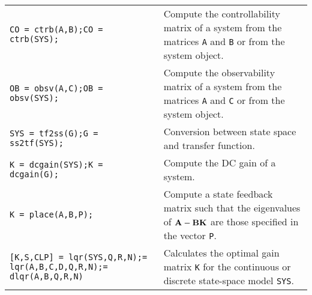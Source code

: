 \begin{landscape}
\begin{multicols*}{2}
\begin{table}[H]
\begin{tabularx}{\linewidth}{p{5cm} X}
				\texttt{CO = ctrb(A,B);\newline CO = ctrb(SYS);} & Compute the controllability matrix of a system from the matrices \texttt{A} and \texttt{B} or from the system object. \\

				\texttt{OB = obsv(A,C);\newline OB = obsv(SYS);} & Compute the observability matrix of a system from the matrices \texttt{A} and \texttt{C} or from the system object. \\

				\midrule
			
				\texttt{SYS = tf2ss(G);\newline G = ss2tf(SYS);} & Conversion between state space and transfer function. \\

				\texttt{K = dcgain(SYS);\newline K = dcgain(G);} & Compute the DC gain of a system. \\

				\midrule

				\texttt{K = place(A,B,P);} & Compute a state feedback matrix such that the eigenvalues of \(\bm{\mathrm{A}} - \bm{\mathrm{B}}\bm{\mathrm{K}}\) are those specified in the vector \texttt{P}. \\

				\texttt{[K,S,CLP] = lqr(SYS,Q,R,N);\newline [K,S,CLP] = lqr(A,B,C,D,Q,R,N);\newline [K,S,CLP] = dlqr(A,B,Q,R,N)} & Calculates the optimal gain matrix \texttt{K} for the continuous or discrete state-space model \texttt{SYS}. \\

				\bottomrule
			\end{tabularx}
		\end{table}

	\end{multicols*}
\end{landscape}
\restoregeometry
